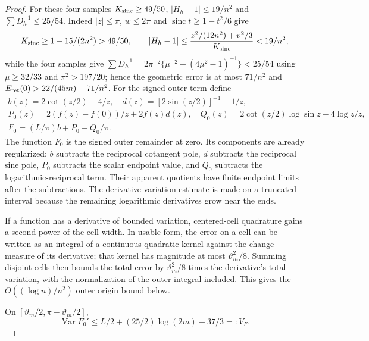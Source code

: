 \begin{proof}
For these four samples
$K_{\rm sinc}\geq49/50$, $|H_h-1|\leq19/n^2$ and
$\sum D_h^{-1}\leq25/54$. Indeed $|z|\leq\pi$, $w\leq2\pi$
and $\operatorname{sinc}t\geq1-t^2/6$ give
\[
 K_{\rm sinc}\geq1-15/(2n^2)>49/50,\qquad
 |H_h-1|\leq\frac{z^2/(12n^2)+v^2/3}{K_{\rm sinc}}<19/n^2,
\]
while the four samples give
$\sum D_h^{-1}=2\pi^{-2}\{\mu^{-2}+(4\mu^2-1)^{-1}\}<25/54$
using $\mu\geq32/33$ and $\pi^2>197/20$;
hence the geometric error is at most $71/n^2$ and
$E_{\rm ret}(0)>22/(45m)-71/n^2$.
For the signed outer term define
\[
 \begin{gathered}
 b(z)=2\cot(z/2)-4/z,\quad d(z)=[2\sin(z/2)]^{-1}-1/z,
 \\ P_0(z)=2(f(z)-f(0))/z+2f(z)d(z),\quad
 Q_0(z)=2\cot(z/2)\log\sin z-4\log z/z,\\
 F_0=(L/\pi)b+P_0+Q_0/\pi.
 \end{gathered}
\]
The function $F_0$ is the signed outer remainder at zero. Its
components are already regularized: $b$ subtracts the reciprocal
cotangent pole, $d$ subtracts the reciprocal sine pole, $P_0$ subtracts
the scalar endpoint value, and $Q_0$ subtracts the logarithmic-reciprocal
term. Their apparent quotients have finite endpoint limits after the
subtractions. The derivative variation estimate is made on a truncated
interval because the remaining logarithmic derivatives grow near the
ends.

If a function has a derivative of bounded variation, centered-cell
quadrature gains a second power of the cell width. In usable form,
the error on a cell can be written as an integral of a continuous
quadratic kernel against the change measure of its derivative; that
kernel has magnitude at most $\vartheta_m^2/8$. Summing disjoint cells then
bounds the total error by $\vartheta_m^2/8$ times the derivative's total
variation, with the normalization of the outer integral included.
This gives the $O((\log n)/n^2)$ outer origin bound below.

On $[\vartheta_m/2,\pi-\vartheta_m/2]$,
\begin{equation}\label{uc:origin-variation}
 \operatorname{Var}F_0'\leq L/2+(25/2)\log(2m)+37/3=:V_F.
\end{equation}

\end{proof}
